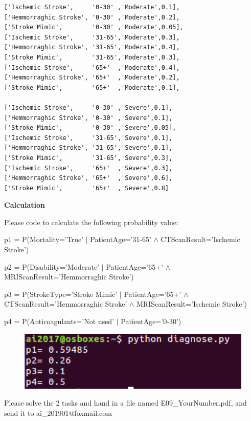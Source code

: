 \documentclass[a4paper, 11pt]{article}
\begin{document}
\begin{lstlisting}
['Ischemic Stroke',     '0-30' ,'Moderate',0.1],
['Hemmorraghic Stroke', '0-30' ,'Moderate',0.2],
['Stroke Mimic',        '0-30' ,'Moderate',0.05],
['Ischemic Stroke',     '31-65','Moderate',0.3],
['Hemmorraghic Stroke', '31-65','Moderate',0.4],
['Stroke Mimic',        '31-65','Moderate',0.3],
['Ischemic Stroke',     '65+'  ,'Moderate',0.4],
['Hemmorraghic Stroke', '65+'  ,'Moderate',0.2],
['Stroke Mimic',        '65+'  ,'Moderate',0.1],

['Ischemic Stroke',     '0-30' ,'Severe',0.1],
['Hemmorraghic Stroke', '0-30' ,'Severe',0.1],
['Stroke Mimic',        '0-30' ,'Severe',0.05],
['Ischemic Stroke',     '31-65','Severe',0.1],
['Hemmorraghic Stroke', '31-65','Severe',0.1],
['Stroke Mimic',        '31-65','Severe',0.3],
['Ischemic Stroke',     '65+'  ,'Severe',0.3],
['Hemmorraghic Stroke', '65+'  ,'Severe',0.6],
['Stroke Mimic',        '65+'  ,'Severe',0.8]
\end{lstlisting}
\textbf{Calculation}

Please code to calculate the following probability value:

p1 = P(Mortality='True' $|$ PatientAge='31-65' $\land$ CTScanResult='Ischemic Stroke')

p2 = P(Disability='Moderate' $|$ PatientAge='65+' $\land$  MRIScanResult='Hemmorraghic Stroke')

p3 = P(StrokeType='Stroke Mimic' $|$ PatientAge='65+' $\land$ CTScanResult='Hemmorraghic Stroke' $\land$ MRIScanResult='Ischemic Stroke')

p4 = P(Anticoagulants='Not used' $|$ PatientAge='0-30')

\begin{figure}[ht]
\centering
\includegraphics[width=12cm]{fig/diagnose_result}
\end{figure}

Please solve the 2 tasks and hand in a file named \textsf{E09\_YourNumber.pdf}, and send it to \textsf{ai\_201901@foxmail.com}
\end{document}
